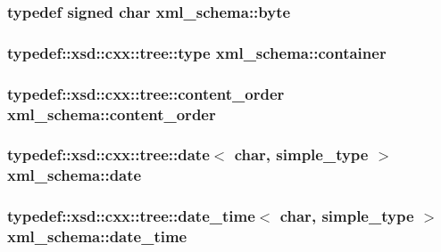 \subsubsection[{\texorpdfstring{byte}{byte}}]{\setlength{\rightskip}{0pt plus 5cm}typedef signed char {\bf xml\+\_\+schema\+::byte}}\hypertarget{namespacexml__schema_a2a462724b41fb68016d13b34f9a84b7d}{}\label{namespacexml__schema_a2a462724b41fb68016d13b34f9a84b7d}
\subsubsection[{\texorpdfstring{container}{container}}]{\setlength{\rightskip}{0pt plus 5cm}typedef\+::xsd\+::cxx\+::tree\+::type {\bf xml\+\_\+schema\+::container}}\hypertarget{namespacexml__schema_ada9aa30dc722e93ee2ed7243085402a5}{}\label{namespacexml__schema_ada9aa30dc722e93ee2ed7243085402a5}
\subsubsection[{\texorpdfstring{content\+\_\+order}{content_order}}]{\setlength{\rightskip}{0pt plus 5cm}typedef\+::xsd\+::cxx\+::tree\+::content\+\_\+order {\bf xml\+\_\+schema\+::content\+\_\+order}}\hypertarget{namespacexml__schema_ae41cf99d54d24cb0112ce5dc08726476}{}\label{namespacexml__schema_ae41cf99d54d24cb0112ce5dc08726476}
\subsubsection[{\texorpdfstring{date}{date}}]{\setlength{\rightskip}{0pt plus 5cm}typedef\+::xsd\+::cxx\+::tree\+::date$<$ char, {\bf simple\+\_\+type} $>$ {\bf xml\+\_\+schema\+::date}}\hypertarget{namespacexml__schema_abc702b2b5f66618b0fdbbbe484492b4d}{}\label{namespacexml__schema_abc702b2b5f66618b0fdbbbe484492b4d}
\subsubsection[{\texorpdfstring{date\+\_\+time}{date_time}}]{\setlength{\rightskip}{0pt plus 5cm}typedef\+::xsd\+::cxx\+::tree\+::date\+\_\+time$<$ char, {\bf simple\+\_\+type} $>$ {\bf xml\+\_\+schema\+::date\+\_\+time}}\hypertarget{namespacexml__schema_a94af98c4870fb2715706678639c97224}{}\label{namespacexml__schema_a94af98c4870fb2715706678639c97224}
